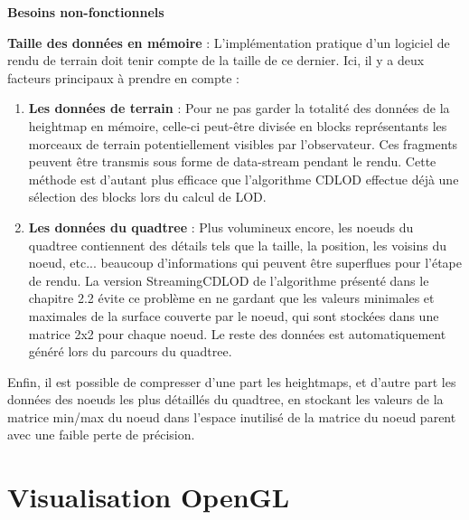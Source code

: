 \documentclass[12pt]{report}
\begin{document}
\vspace{0.3cm}

\textbf{Besoins non-fonctionnels}

\textbf{Taille des données en mémoire} : L'implémentation pratique d'un logiciel de rendu de terrain doit tenir compte de la taille de ce dernier. Ici, il y a deux facteurs principaux à prendre en compte :
\begin{enumerate}
    \item \textbf{Les données de terrain} : Pour ne pas garder la totalité des données de la heightmap en mémoire, celle-ci peut-être divisée en blocks représentants les morceaux de terrain potentiellement visibles par l'observateur. Ces fragments peuvent être transmis sous forme de data-stream pendant le rendu. Cette méthode est d'autant plus efficace que l'algorithme CDLOD effectue déjà une sélection des blocks lors du calcul de LOD. \newpage
    \item \textbf{Les données du quadtree} : Plus volumineux encore, les noeuds du quadtree contiennent des détails tels que la taille, la position, les voisins du noeud, etc... beaucoup d'informations qui peuvent être superflues pour l'étape de rendu. La version StreamingCDLOD de l'algorithme présenté dans le chapitre 2.2 évite ce problème en ne gardant que les valeurs minimales et maximales de la surface couverte par le noeud, qui sont stockées dans une matrice 2x2 pour chaque noeud. Le reste des données est automatiquement généré lors du parcours du quadtree.
\end{enumerate}

Enfin, il est possible de compresser d'une part les heightmaps, et d'autre part les données des noeuds les plus détaillés du quadtree, en stockant les valeurs de la matrice min/max du noeud dans l'espace inutilisé de la matrice du noeud parent avec une faible perte de précision.

\section{Visualisation OpenGL}
\end{document}
